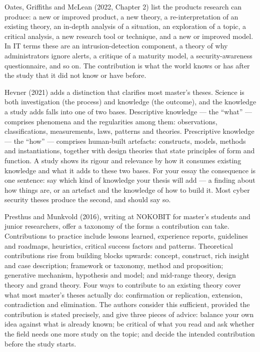 \documentclass[11pt,a4paper,british,twoside=false,headings=small,chapterprefix=false,numbers=noenddot]{scrbook}
\begin{document}
Oates, Griffiths and McLean (2022, Chapter 2) list the products research can produce: a new or improved product, a new theory, a re-interpretation of an existing theory, an in-depth analysis of a situation, an exploration of a topic, a critical analysis, a new research tool or technique, and a new or improved model. In IT terms these are an intrusion-detection component, a theory of why administrators ignore alerts, a critique of a maturity model, a security-awareness questionnaire, and so on. The contribution is what the world knows or has after the study that it did not know or have before.

Hevner (2021) adds a distinction that clarifies most master's theses. Science is both investigation (the process) and knowledge (the outcome), and the knowledge a study adds falls into one of two bases. Descriptive knowledge --- the ``what'' --- comprises phenomena and the regularities among them: observations, classifications, measurements, laws, patterns and theories. Prescriptive knowledge --- the ``how'' --- comprises human-built artefacts: constructs, models, methods and instantiations, together with design theories that state principles of form and function. A study shows its rigour and relevance by how it consumes existing knowledge and what it adds to these two bases. For your essay the consequence is one sentence: say which kind of knowledge your thesis will add --- a finding about how things are, or an artefact and the knowledge of how to build it. Most cyber security theses produce the second, and should say so.

Presthus and Munkvold (2016), writing at NOKOBIT for master's students and junior researchers, offer a taxonomy of the forms a contribution can take. Contributions to practice include lessons learned, experience reports, guidelines and roadmaps, heuristics, critical success factors and patterns. Theoretical contributions rise from building blocks upwards: concept, construct, rich insight and case description; framework or taxonomy, method and proposition; generative mechanism, hypothesis and model; and mid-range theory, design theory and grand theory. Four ways to contribute to an existing theory cover what most master's theses actually do: confirmation or replication, extension, contradiction and elimination. The authors consider this sufficient, provided the contribution is stated precisely, and give three pieces of advice: balance your own idea against what is already known; be critical of what you read and ask whether the field needs one more study on the topic; and decide the intended contribution before the study starts.
\end{document}
